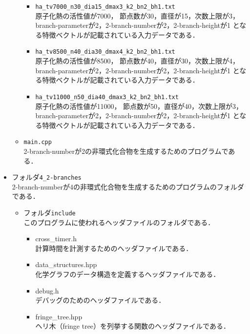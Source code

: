 \documentclass[11pt,titlepage,dvipdfmx,twoside]{jarticle}
\begin{document}
\begin{itemize}
\begin{itemize}
\begin{itemize}
			\item{\tt ha\_tv7000\_n30\_dia15\_dmax3\_k2\_bn2\_bh1.txt}\\
				原子化熱の活性値が7000，
				節点数が30，直径が15，次数上限が3，branch-parameterが2，2-branch-numberが2，2-branch-heightが1
				となる特徴ベクトルが記載されている入力データである．
				
			\item{\tt ha\_tv8500\_n40\_dia30\_dmax4\_k2\_bn2\_bh1.txt}\\
				原子化熱の活性値が8500，
				節点数が40，直径が30，次数上限が4，branch-parameterが2，2-branch-numberが2，2-branch-heightが1
				となる特徴ベクトルが記載されている入力データである．
				
			\item{\tt ha\_tv11000\_n50\_dia40\_dmax3\_k2\_bn2\_bh1.txt}\\
				原子化熱の活性値が11000，
				節点数が50，直径が40，次数上限が3，branch-parameterが2，2-branch-numberが2，2-branch-heightが1
				となる特徴ベクトルが記載されている入力データである．
		\end{itemize}
		
	\item {\tt main.cpp}\\
	2-branch-numberが2の非環式化合物を生成するためのプログラムである．
	\end{itemize}
		
\item フォルダ{\tt 4\_2-branches}\\
	2-branch-numberが4の非環式化合物を生成するためのプログラムのフォルダである．
	\begin{itemize}
	\item フォルダ{\tt include}\\
		このプログラムに使われるヘッダファイルのフォルダである．
		\begin{itemize}
			\item{cross\_timer.h}\\
				計算時間を計測するためのヘッダファイルである．
				
			\item{data\_structures.hpp}\\
				化学グラフのデータ構造を定義するヘッダファイルである． 
				
			\item{debug.h}\\
				デバッグのためのヘッダファイルである．
				
			\item{fringe\_tree.hpp}\\
				ヘリ木（fringe tree）を列挙する関数のヘッダファイルである．
				

\end{itemize}
\end{itemize}
\end{itemize}
\end{document}
